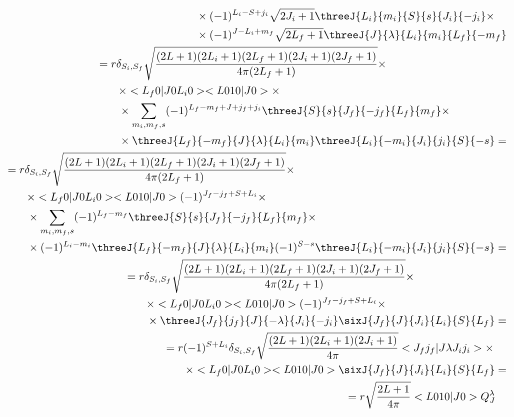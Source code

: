 \begin{align}
\begin{split}
        &\qquad\times (-1)^{L_i - S + j_i} \sqrt{2J_i+1} \threeJ{L_i}{m_i}{S}{s}{J_i}{-j_i} \times \\
        &\qquad\times (-1)^{J - L_i + m_f} \sqrt{2L_f+1} \threeJ{J}{\lambda}{L_i}{m_i}{L_f}{-m_f}
    \end{split} \\
    \begin{split}
        &= r \delta_{S_i, S_f} \sqrt{\frac{(2L+1)(2L_i+1)(2L_f+1)(2J_i+1)(2J_f+1)}{4\pi (2L_f+1)}} \times \\
        &\qquad\times <L_f 0 | J 0 L_i 0> <L 0 1 0 | J 0> \times \\
        &\qquad\times \sum_{m_i, m_f, s} (-1)^{L_f - m_f + J + j_f + j_i} \threeJ{S}{s}{J_f}{-j_f}{L_f}{m_f} \times \\
        &\qquad\times \threeJ{L_f}{-m_f}{J}{\lambda}{L_i}{m_i} \threeJ{L_i}{-m_i}{J_i}{j_i}{S}{-s} =
    \end{split} \\
    \begin{split}
        &= r \delta_{S_i, S_f} \sqrt{\frac{(2L+1)(2L_i+1)(2L_f+1)(2J_i+1)(2J_f+1)}{4\pi (2L_f+1)}} \times \\
        &\qquad\times <L_f 0 | J 0 L_i 0> <L 0 1 0 | J 0> (-1)^{J_f-j_f + S + L_i} \times \\
        &\qquad\times \sum_{m_i, m_f, s} (-1)^{L_f - m_f} \threeJ{S}{s}{J_f}{-j_f}{L_f}{m_f} \times \\
        &\qquad\times (-1)^{L_i - m_i} \threeJ{L_f}{-m_f}{J}{\lambda}{L_i}{m_i} (-1)^{S - s}\threeJ{L_i}{-m_i}{J_i}{j_i}{S}{-s} =
    \end{split} \\
    \begin{split}
        &= r \delta_{S_i, S_f} \sqrt{\frac{(2L+1)(2L_i+1)(2L_f+1)(2J_i+1)(2J_f+1)}{4\pi (2L_f+1)}} \times \\
        &\qquad\times <L_f 0 | J 0 L_i 0> <L 0 1 0 | J 0> (-1)^{J_f-j_f + S + L_i} \times \\
        &\qquad\times \threeJ{J_f}{j_f}{J}{-\lambda}{J_i}{-j_i} \sixJ{J_f}{J}{J_i}{L_i}{S}{L_f} =
    \end{split} \\
    \begin{split}
        &= r (-1)^{ S + L_i} \delta_{S_i, S_f} \sqrt{\frac{(2L+1)(2L_i+1)(2J_i+1)}{4\pi}} <J_f j_f | J \lambda J_i j_i> \times \\
        &\qquad\times <L_f 0 | J 0 L_i 0> <L 0 1 0 | J 0> \sixJ{J_f}{J}{J_i}{L_i}{S}{L_f} =
    \end{split} \\
    \begin{split}
        &=r \sqrt{\frac{2L+1}{4 \pi}} <L 0 1 0 | J 0> Q_{J}^{\lambda}
    \end{split}
\end{align}


